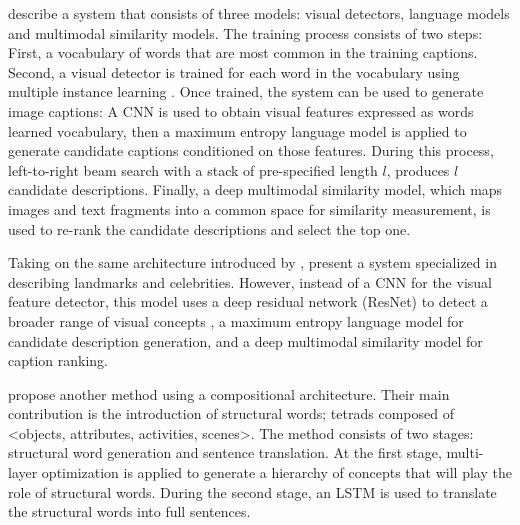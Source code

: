 \citet{Fang2015} describe a system that consists of three models: visual detectors, language models and multimodal similarity models. The training process consists of two steps: First, a vocabulary of words that are most common in the training captions. Second, a visual detector is trained for each word in the vocabulary using multiple instance learning  \citep{Viola2005}. Once trained, the system can be used to generate image captions: A CNN \citep{Krizhevsky2012} is used to obtain visual features expressed as words learned vocabulary, then a maximum entropy language model \citep{Berger1996} is applied to generate candidate captions conditioned on those features. During this process, left-to-right beam search \citep{Ratnaparkhi2000} with a stack of pre-specified length $l$, produces $l$ candidate descriptions. Finally, a deep multimodal similarity model, which maps images and text fragments into a common space for similarity measurement, is used to re-rank the candidate descriptions and select the top one.

Taking on the same architecture introduced by \citet{Fang2015}, \citet{Tran2016} present a system specialized in describing landmarks and celebrities. However, instead of a CNN for the visual feature detector, this model uses a deep residual network (ResNet) to detect a broader range of visual concepts \cite{He2016resnet}, a maximum entropy language model for candidate description generation, and a deep multimodal similarity model for caption ranking. 

\citet{Ma2016} propose another method using a compositional architecture. Their main contribution is the introduction of structural words; tetrads composed of <objects, attributes, activities, scenes>. The method consists of two stages: structural word generation and sentence translation. At the first stage, multi-layer optimization is applied to generate a hierarchy of concepts that will play the role of structural words. During the second stage, an LSTM is used to translate the structural words into full sentences.

